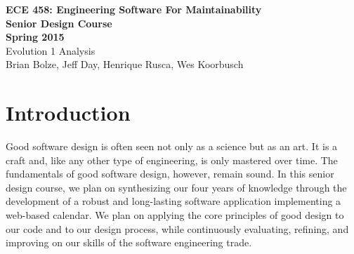 \documentclass[11pt]{article}
\begin{document}
\begin{center}
\textbf{ECE 458: Engineering Software For Maintainability \\
Senior Design Course\\
Spring 2015\\[0.2in]}
Evolution 1 Analysis\\
Brian Bolze, Jeff Day, Henrique Rusca, Wes Koorbusch
\end{center}

\tableofcontents





\pagebreak

\section{Introduction}

Good software design is often seen not only as a science but as an art. It is a craft and, like any other type of engineering, is only mastered over time. The fundamentals of good software design, however, remain sound. In this senior design course, we plan on synthesizing our four years of knowledge through the development of a robust and long-lasting software application implementing a web-based calendar. We plan on applying the core principles of good design to our code and to our design process, while continuously evaluating, refining, and improving on our skills of the software engineering trade. 
\end{document}
